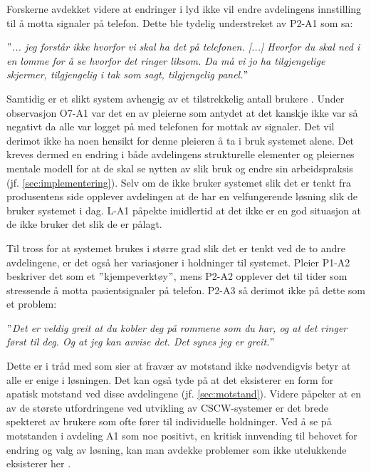 \noindent
Forskerne avdekket videre at endringer i lyd ikke vil endre avdelingens innstilling til å motta signaler på telefon. Dette ble tydelig understreket av P2-A1 som sa:

\noindent
\textit{$"$... jeg forstår ikke hvorfor vi skal ha det på telefonen. [...] Hvorfor du skal ned i en lomme for å se hvorfor det ringer liksom. Da må vi jo ha tilgjengelige skjermer, tilgjengelig i tak som sagt, tilgjengelig panel.$"$}

\noindent
Samtidig er et slikt system avhengig av et tilstrekkelig antall brukere \citep{Ackerman00}. Under observasjon O7-A1 var det en av pleierne som antydet at det kanskje ikke var så negativt da alle var logget på med telefonen for mottak av signaler. Det vil derimot ikke ha noen hensikt for denne pleieren å ta i bruk systemet alene. Det kreves dermed en endring i både avdelingens strukturelle elementer og pleiernes mentale modell for at de skal se nytten av slik bruk og endre sin arbeidspraksis (jf. \ref{sec:implementering}). Selv om de ikke bruker systemet slik det er tenkt fra produsentens side opplever avdelingen at de har en velfungerende løsning slik de bruker systemet i dag. L-A1 påpekte imidlertid at det ikke er en god situasjon at de ikke bruker det slik de er pålagt. 

\noindent
Til tross for at systemet brukes i større grad slik det er tenkt ved de to andre avdelingene, er det også her variasjoner i holdninger til systemet. Pleier P1-A2 beskriver det som et $"$kjempeverktøy$"$, mens P2-A2 opplever det til tider som stressende å motta pasientsignaler på telefon. P2-A3 så derimot ikke på dette som et problem: 

\noindent
\textit{$"$Det er veldig greit at du kobler deg på rommene som du har, og at det ringer først til deg. Og at jeg kan avvise det. Det synes jeg er greit.$"$}

\noindent
Dette er i tråd med \citet{Jacobsen12} som sier at fravær av motstand ikke nødvendigvis betyr at alle er enige i løsningen. Det kan også tyde på at det eksisterer en form for apatisk motstand ved disse avdelingene (jf. \ref{sec:motstand}). Videre påpeker \citet{Berg99} at en av de største utfordringene ved utvikling av CSCW-systemer er det brede spekteret av brukere som ofte fører til individuelle holdninger. Ved å se på motstanden i avdeling A1 som noe positivt, en kritisk innvending til behovet for endring og valg av løsning, kan man avdekke problemer som ikke utelukkende eksisterer her \citep{Jacobsen12}.

